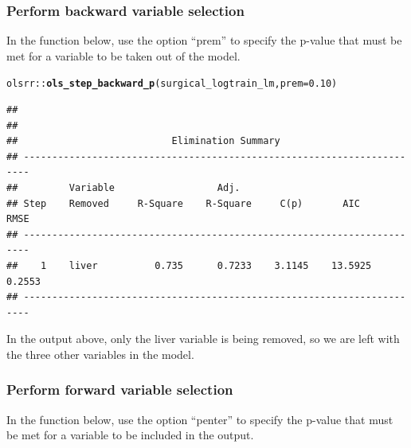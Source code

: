 \documentclass{article}\usepackage[]{graphicx}\usepackage[]{color}
\makeatletter
\newcommand{\hlnum}[1]{\textcolor[rgb]{0.686,0.059,0.569}{#1}}%
\newcommand{\hlopt}[1]{\textcolor[rgb]{0,0,0}{#1}}%
\newcommand{\hlstd}[1]{\textcolor[rgb]{0.345,0.345,0.345}{#1}}%
\newcommand{\hlkwc}[1]{\textcolor[rgb]{0.333,0.667,0.333}{#1}}%
\newcommand{\hlkwd}[1]{\textcolor[rgb]{0.737,0.353,0.396}{\textbf{#1}}}%
\newenvironment{kframe}{%
 \def\at@end@of@kframe{}%
 \ifinner\ifhmode%
  \def\at@end@of@kframe{\end{minipage}}%
  \begin{minipage}{\columnwidth}%
 \fi\fi%
 \def\FrameCommand##1{\hskip\@totalleftmargin \hskip-\fboxsep
 \colorbox{shadecolor}{##1}\hskip-\fboxsep
     \hskip-\linewidth \hskip-\@totalleftmargin \hskip\columnwidth}%
 \MakeFramed {\advance\hsize-\width
   \@totalleftmargin\z@ \linewidth\hsize
   \@setminipage}}%
 {\par\unskip\endMakeFramed%
 \at@end@of@kframe}
\newenvironment{knitrout}{}{} %
\makeatother
\begin{document}
\subsubsection*{Perform backward variable selection}

In the function below, use the option ``prem'' to specify the p-value that must be met for a variable to be taken out of the model.

\begin{knitrout}
\color{fgcolor}\begin{kframe}
\begin{alltt}
\hlstd{olsrr}\hlopt{::}\hlkwd{ols_step_backward_p}\hlstd{(surgical_logtrain_lm,} \hlkwc{prem} \hlstd{=} \hlnum{0.10}\hlstd{)}
\end{alltt}
\begin{verbatim}
## 
## 
##                           Elimination Summary                           
## -----------------------------------------------------------------------
##         Variable                  Adj.                                     
## Step    Removed     R-Square    R-Square     C(p)       AIC       RMSE     
## -----------------------------------------------------------------------
##    1    liver          0.735      0.7233    3.1145    13.5925    0.2553    
## -----------------------------------------------------------------------
\end{verbatim}
\end{kframe}
\end{knitrout}

In the output above, only the liver variable is being removed, so we are left with the three other variables in the model.

\subsubsection*{Perform forward variable selection}

In the function below, use the option ``penter'' to specify the p-value that must be met for a variable to be included in the output.
\end{document}

